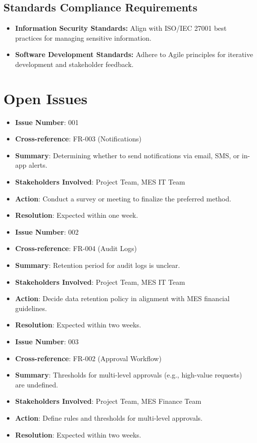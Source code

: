\documentclass[12pt]{article}
\begin{document}
\subsection{Standards Compliance Requirements}
\begin{itemize}
    \item \textbf{Information Security Standards:} Align with ISO/IEC 27001 best practices for managing sensitive information.
    \item \textbf{Software Development Standards:} Adhere to Agile principles for iterative development and stakeholder feedback.
\end{itemize}

\section{Open Issues}
\begin{itemize}
  \item \textbf{Issue Number}: 001  
  \item \textbf{Cross-reference}: FR-003 (Notifications)  
  \item \textbf{Summary}: Determining whether to send notifications via email, SMS, or in-app alerts.  
  \item \textbf{Stakeholders Involved}: Project Team, MES IT Team  
  \item \textbf{Action}: Conduct a survey or meeting to finalize the preferred method.  
  \item \textbf{Resolution}: Expected within one week.

  \bigskip

  \item \textbf{Issue Number}: 002  
  \item \textbf{Cross-reference}: FR-004 (Audit Logs)  
  \item \textbf{Summary}: Retention period for audit logs is unclear.  
  \item \textbf{Stakeholders Involved}: Project Team, MES IT Team  
  \item \textbf{Action}: Decide data retention policy in alignment with MES financial guidelines.  
  \item \textbf{Resolution}: Expected within two weeks.

  \bigskip

  \item \textbf{Issue Number}: 003  
  \item \textbf{Cross-reference}: FR-002 (Approval Workflow)  
  \item \textbf{Summary}: Thresholds for multi-level approvals (e.g., high-value requests) are undefined.  
  \item \textbf{Stakeholders Involved}: Project Team, MES Finance Team  
  \item \textbf{Action}: Define rules and thresholds for multi-level approvals.  
  \item \textbf{Resolution}: Expected within two weeks.

  \bigskip
\end{itemize}
\end{document}
